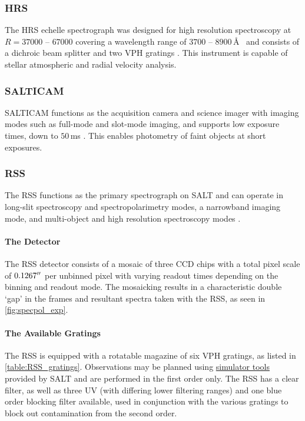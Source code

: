 \subsubsection{\gls{HRS}}

The \gls{HRS} echelle spectrograph was designed for high resolution spectroscopy at $R = 37000$ -- $67000$ covering a wavelength range of $3700$ -- $8900$\,\AA\ \citep{HRS, HRS_init, SALT_HRS} and consists of a dichroic beam splitter and two \gls{VPH} gratings \citep{SALT_hires}.
This instrument is capable of stellar atmospheric and radial velocity analysis.

\subsubsection{\gls{SALTICAM}}

\Gls{SALTICAM} functions as the acquisition camera and science imager with imaging modes such as full-mode and slot-mode imaging, and supports low exposure times, down to $50$\,ms \citep{SALTICAM}.
This enables photometry of faint objects at short exposures.

\subsubsection{\gls{RSS}} \label{subsubsec:RSS}

The \gls{RSS} functions as the primary spectrograph on \gls{SALT} and can operate in long-slit spectroscopy and spectropolarimetry modes, a narrowband imaging mode, and multi-object and high resolution spectroscopy modes \citep[for an in-depth discussion on operational modes see][]{SALT_operational_modes, SALT_CFP}.

\paragraph{The Detector}
The \gls{RSS} detector consists of a mosaic of three \gls{CCD} chips with a total pixel scale of $0.1267\hbox{$^{\prime\prime}$}$ per unbinned pixel with varying readout times depending on the binning and readout mode.
The mosaicking results in a characteristic double `gap' in the frames and resultant spectra taken with the \gls{RSS}, as seen in \autoref{fig:specpol_exp}.

\paragraph{The Available Gratings}
The \gls{RSS} is equipped with a rotatable magazine of six \gls{VPH} gratings, as listed in \autoref{table:RSS_gratings}.
Observations may be planned using \href{https://astronomers.salt.ac.za/software/}{simulator tools} provided by \gls{SALT} and are performed in the first order only.
The \gls{RSS} has a clear filter, as well as three \gls{UV} (with differing lower filtering ranges) and one blue order blocking filter available, used in conjunction with the various gratings to block out contamination from the second order.

